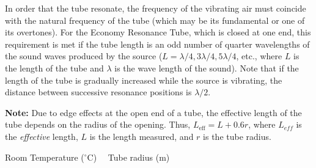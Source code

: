 In order that the tube resonate, the frequency of the vibrating air must coincide with the natural frequency of the tube (which may be its fundamental or one of its overtones). For the Economy Resonance Tube, which is closed at one end, this requirement is met if the tube length is an odd number of quarter wavelengths of the sound waves produced by the source ($L = \lambda/4, 3 \lambda/4, 5 \lambda/4$, etc., where $L$ is the length of the tube and $\lambda$ is the wave length of the sound). Note that if the length of the tube is gradually increased while the source is vibrating, the distance between successive resonance positions is $\lambda/2$. 

\textbf{Note:} Due to edge effects at the open end of a tube, the effective length of the tube depends on the radius of the opening. Thus, $L_{\mathrm{eff}} = L + 0.6r$, where $L_{eff}$ is the \textit{effective} length, $L$ is the length measured, and $r$ is the tube radius.

\medskip
Room Temperature ($^\circ$C) \hrulefill \ \  Tube radius (m) \hrulefill

\bigskip

